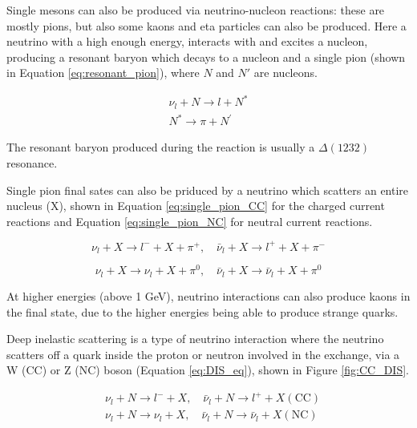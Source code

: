 Single mesons can also be produced via neutrino-nucleon reactions: these are mostly pions, but also some kaons and eta particles can also be produced. Here a neutrino with a high enough energy, interacts with and excites a nucleon, producing a resonant baryon which decays to a nucleon and a single pion (shown in Equation \ref{eq:resonant_pion}), where $N$ and $N'$ are nucleons.

$$
\begin{gathered}
\nu_{l}+N \rightarrow l+N^{*} \\
N^{*} \rightarrow \pi+N^{\prime}
\end{gathered}
\label{eq:resonant_pion}
$$

The resonant baryon produced during the reaction is usually a $\Delta(1232)$ resonance. 

Single pion final sates can also be priduced by a neutrino which scatters an entire nucleus (X), shown in Equation \ref{eq:single_pion_CC} for the charged current reactions and Equation \ref{eq:single_pion_NC} for neutral current reactions. 

\begin{equation}
\nu_{l}+X \rightarrow l^{-}+X+\pi^{+}, \quad \bar{\nu}_{l}+X \rightarrow l^{+}+X+\pi^{-}
\label{eq:single_pion_CC}
\end{equation}

\begin{equation}
\nu_{l}+X \rightarrow \nu_{l}+X+\pi^{0}, \quad \bar{\nu}_{l}+X \rightarrow \bar{\nu}_{l}+X+\pi^{0}
\label{eq:single_pion_NC}
\end{equation}

At higher energies (above 1 GeV), neutrino interactions can also produce kaons in the final state, due to the higher energies being able to produce strange quarks. 

Deep inelastic scattering is a type of neutrino interaction where the neutrino scatters off a quark inside the proton or neutron involved in the exchange, via a W (CC) or Z (NC) boson (Equation \ref{eq:DIS_eq}), shown in Figure \ref{fig:CC_DIS}.

$$
\begin{aligned}
&\nu_{l}+N \rightarrow l^{-}+X, \quad \bar{\nu}_{l}+N \rightarrow l^{+}+X(\mathrm{CC}) \\
&\nu_{l}+N \rightarrow \nu_{l}+X, \quad \bar{\nu}_{l}+N \rightarrow \bar{\nu}_{l}+X(\mathrm{NC})
\end{aligned}
\label{eq:DIS_eq}
$$

